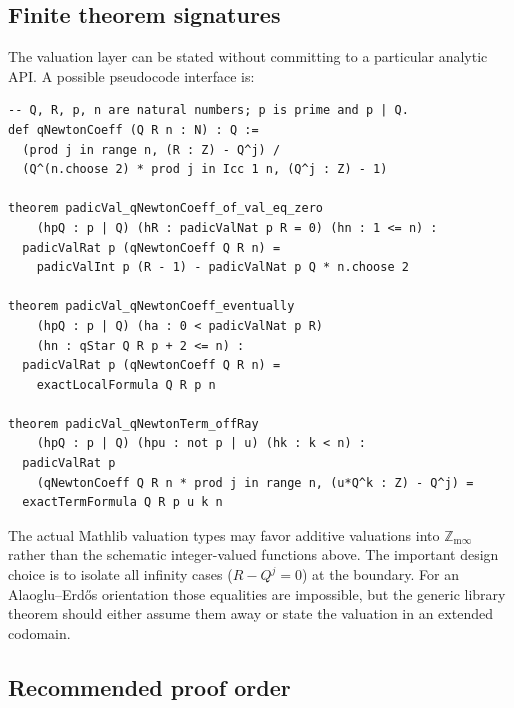 \documentclass[11pt,oneside]{article}
\theoremstyle{definition}
\newcommand{\AEconj}{Alaoglu--Erd\H{o}s}
\begin{document}
\subsection{Finite theorem signatures}

The valuation layer can be stated without committing to a particular analytic API.  A
possible pseudocode interface is:

\begin{lstlisting}[style=pseudocode,language={}] 
-- Q, R, p, n are natural numbers; p is prime and p | Q.
def qNewtonCoeff (Q R n : N) : Q :=
  (prod j in range n, (R : Z) - Q^j) /
  (Q^(n.choose 2) * prod j in Icc 1 n, (Q^j : Z) - 1)

theorem padicVal_qNewtonCoeff_of_val_eq_zero
    (hpQ : p | Q) (hR : padicValNat p R = 0) (hn : 1 <= n) :
  padicValRat p (qNewtonCoeff Q R n) =
    padicValInt p (R - 1) - padicValNat p Q * n.choose 2

theorem padicVal_qNewtonCoeff_eventually
    (hpQ : p | Q) (ha : 0 < padicValNat p R)
    (hn : qStar Q R p + 2 <= n) :
  padicValRat p (qNewtonCoeff Q R n) =
    exactLocalFormula Q R p n

theorem padicVal_qNewtonTerm_offRay
    (hpQ : p | Q) (hpu : not p | u) (hk : k < n) :
  padicValRat p
    (qNewtonCoeff Q R n * prod j in range n, (u*Q^k : Z) - Q^j) =
  exactTermFormula Q R p u k n
\end{lstlisting}

The actual Mathlib valuation types may favor additive valuations into
$\mathbb Z_{\mathrm m\infty}$ rather than the schematic integer-valued functions above.
The important design choice is to isolate all infinity cases ($R-Q^j=0$) at the boundary.
For an \AEconj{} orientation those equalities are impossible, but the generic library theorem
should either assume them away or state the valuation in an extended codomain.

\subsection{Recommended proof order}
\end{document}
